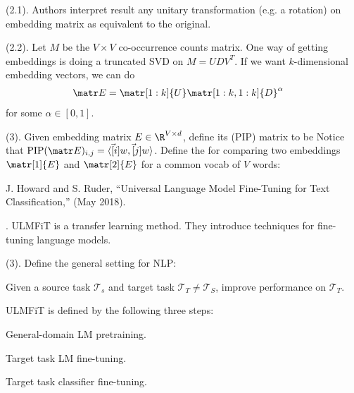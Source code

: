 \documentclass[11pt]{article}
\begin{document}
\p {} (2.1). Authors interpret result any unitary transformation (e.g. a rotation) on embedding matrix as equivalent to the original. 

\myspace
\p {} (2.2). Let $M$ be the $V \times V$ co-occurrence counts matrix. One way of getting embeddings is doing a truncated SVD on $M = UDV^T$. If we want $k$-dimensional embedding vectors, we can do
\begin{align}
\matr E
&= \matr[1:k]{U} \matr[1:k, 1:k]{D}^{\alpha}
\end{align}
for some $\alpha \in [0, 1]$. 

\myspace
\p {} (3). Given embedding matrix $E \in \R^{V \times d}$, define its  (PIP) matrix to be 
Notice that $\text{PIP}(\matr E)_{i,j} = \langle \vec[i]{w}, \vec[j]{w} \rangle$. Define the  for comparing two embeddings $\matr[1]{E}$ and $\matr[2]{E}$ for a common vocab of $V$ words:






\vspace{-1em}
{\footnotesize J. Howard and S. Ruder, ``Universal Language Model Fine-Tuning for Text Classification,'' (May 2018).}

\p {}. ULMFiT is a transfer learning method. They introduce techniques for fine-tuning language models.

\myspace
\p {} (3). Define the general  setting for NLP:
\begin{definition}[-1em]
	Given a source task $\mathcal{T}_s$ and target task $\mathcal{T}_T \ne \mathcal{T}_S$, improve performance on $\mathcal{T}_T$. 
\end{definition}
ULMFiT is defined by the following three steps:
\begin{compactenum}
	\item General-domain LM pretraining.
	\item Target task LM fine-tuning.
	\item Target task classifier fine-tuning.
\end{compactenum}
\end{document}

